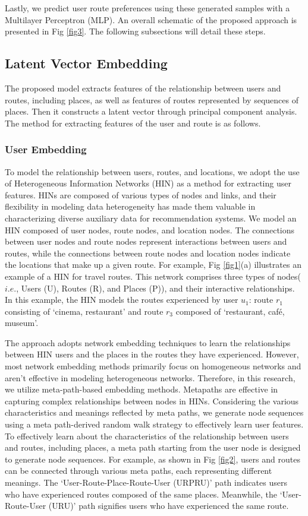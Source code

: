\documentclass[]{article}
\begin{document}
Lastly, we predict user route preferences using these generated samples with a Multilayer Perceptron (MLP). An overall schematic of the proposed approach is presented in Fig \ref{fig3}. The following subsections will detail these steps.

\subsection{Latent Vector Embedding}
The proposed model extracts features of the relationship between users and routes, including places, as well as features of routes represented by sequences of places. Then it constructs a latent vector through principal component analysis. The method for extracting features of the user and route is as follows.

\subsubsection*{User Embedding}

To model the relationship between users, routes, and locations, we adopt the use of Heterogeneous Information Networks (HIN) as a method for extracting user features. HINs are composed of various types of nodes and links, and their flexibility in modeling data heterogeneity has made them valuable in characterizing diverse auxiliary data for recommendation systems. We model an HIN composed of user nodes, route nodes, and location nodes. The connections between user nodes and route nodes represent interactions between users and routes, while the connections between route nodes and location nodes indicate the locations that make up a given route. For example, Fig \ref{fig1}(a) illustrates an example of a HIN for travel routes. This network comprises three types of nodes($i.e.$, Users (U), Routes (R), and Places (P)), and their interactive relationships. In this example, the HIN models the routes experienced by user $u_1$: route $r_1$ consisting of `cinema, restaurant' and route $r_3$ composed of `restaurant, café, museum'.

The approach adopts network embedding techniques to learn the relationships between HIN users and the places in the routes they have experienced. However, most network embedding methods primarily focus on homogeneous networks and aren't effective in modeling heterogeneous networks. Therefore, in this research, we utilize meta-path-based embedding methods. Metapaths are effective in capturing complex relationships between nodes in HINs. Considering the various characteristics and meanings reflected by meta paths, we generate node sequences using a meta path-derived random walk strategy to effectively learn user features. To effectively learn about the characteristics of the relationship between users and routes, including places, a meta path starting from the user node is designed to generate node sequences. For example, as shown in Fig \ref{fig2}, users and routes can be connected through various meta paths, each representing different meanings. The ‘User-Route-Place-Route-User (URPRU)’ path indicates users who have experienced routes composed of the same places. Meanwhile, the ‘User-Route-User (URU)’ path signifies users who have experienced the same route.
\end{document}
